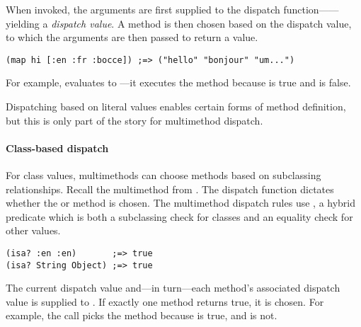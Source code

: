 When invoked, the arguments are first supplied to the dispatch function------yielding
a \emph{dispatch value}. A method is then chosen
based on the dispatch value, to which the arguments are then passed to return a value.
%
\begin{verbatim}
(map hi [:en :fr :bocce]) ;=> ("hello" "bonjour" "um...")
\end{verbatim}
%
For example, 
 evaluates to ---it executes
the  method
because  is true
and  is false.

Dispatching based on literal values enables certain forms of method
definition, but this is only part of the story for multimethod dispatch.

\paragraph{Class-based dispatch}
For class values, multimethods can choose methods based on subclassing
relationships.
%
Recall the multimethod from . %
%
The dispatch function 
dictates 
whether the  or  method is chosen.
%
The multimethod dispatch rules use
, a hybrid predicate which is both a subclassing check for classes and
an equality check for other values.

\begin{verbatim}
(isa? :en :en)       ;=> true
(isa? String Object) ;=> true
\end{verbatim}
%
The current dispatch value and---in turn---each method's associated dispatch value
is supplied to . If exactly one method returns true, it is chosen.
%
For example,
the call
picks the  method because 
is true, and
is not.
%

